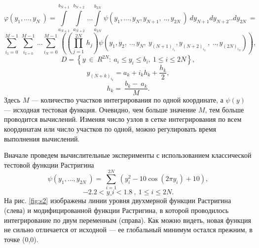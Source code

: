 \documentclass[10pt,a4paper]{book}
\begin{document}
\begin{equation}
\varphi \left( {{y}_{1}},\ldots ,{{y}_{N}}~ \right)=\underset{{{a}_{N+1}}}{\overset{{{b}_{N+1}}}{\mathop \int }}\,\underset{{{a}_{N+2}}}{\overset{{{b}_{N+2}}}{\mathop \int }}\,\ldots \underset{{{a}_{2N}}}{\overset{{{b}_{2N}}}{\mathop \int }}\,\psi \left( {{y}_{1}},\ldots ,{{y}_{N}},{{y}_{N+1}},~..,{{y}_{2N}}~ \right)~d{{y}_{N+1}}d{{y}_{N+2}}..d{{y}_{2N}}~= 
\end{equation}
\begin{displaymath}
\underset{{{i}_{1}}=0}{\overset{M-1}{\mathop \sum }}\,\underset{{{i}_{2=0}}}{\overset{M-1}{\mathop \sum }}\,...\underset{{{i}_{N}}=0}{\overset{M-1}{\mathop \sum }}\,\left( \left( \underset{j=1}{\overset{2N}{\mathop \prod }}\,{{h}_{j}} \right)\psi \left( {{y}_{1}},{{y}_{2}},~..,{{y}_{N}},~{{y}_{{{\left( N+1 \right)}_{{{i}_{1}}}}}},{{y}_{{{\left( N+2 \right)}_{{{i}_{2}}}}}}~,~..,{{y}_{{{\left( 2N \right)}_{{{i}_{N}}}}}} \right) \right),
\end{displaymath}
\begin{displaymath}
D=\left\{ y~\in ~{{R}^{2N}}:~{{a}_{i}}\le {{y}_{i}}\le {{b}_{i}},~1\le i\le 2N \right\},
\end{displaymath}
\begin{equation}
{{y}_{{{\left( N+k \right)}_{{{i}_{k}}}}}}={{a}_{k}}+{{i}_{k}}{{h}_{k}}+\frac{{{h}_{k}}}{2},
\end{equation}
\begin{equation}
{{h}_{k}}=~\frac{{{b}_{k}}-~{{a}_{k}}}{M}.
\end{equation}
Здесь $M$ --- количество участков интегрирования по одной координате, а $\psi(y)$ --- исходная тестовая функция. Очевидно, чем больше значение $M$, тем больше проводится вычислений. Изменяя число узлов в сетке интегрирования по всем координатам или число участков по одной, можно регулировать время выполнения вычислений.


Вначале проведем вычислительные эксперименты с использованием классической тестовой функции Растригина
\begin{equation}
\label{Rastrigin}
\psi \left( {{y}_{1}},\ldots ,{{y}_{2N}}~ \right)=~\underset{i=1}{\overset{2N}{\mathop \sum }}\,(y_{i}^{2}-10\cos \left( 2\pi {{y}_{i}} \right)+10),
\end{equation}
\begin{displaymath}
-2.2<y\_i<1.8~,~1\le i\le 2N.
\end{displaymath}
На рис. \ref{fig:s2} изображены линии уровня двухмерной функции Растригина (слева) и модифицированной функции Растригина, в которой проводилось интегрирование по двум переменным (справа). Как можно видеть, новая функция не сильно отличается от исходной --- ее глобальный минимум остался прежним, в точке (0,0).
\end{document}
